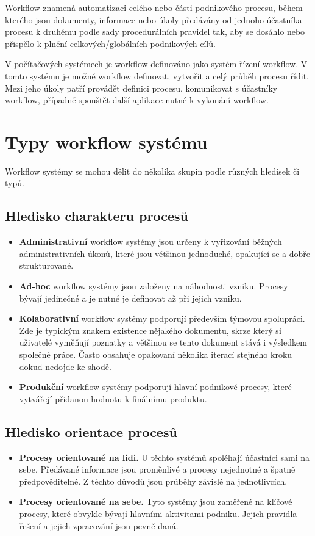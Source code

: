 \documentclass{fithesis}
\begin{document}
Workflow znamená automatizaci celého nebo části podnikového procesu, během kterého jsou dokumenty, informace nebo úkoly předávány od jednoho účastníka procesu k druhému podle sady procedurálních pravidel tak, aby se dosáhlo nebo přispělo k plnění celkových/globálních podnikových cílů. \cite{wfmc}

V počítačových systémech je workflow definováno jako systém řízení workflow. V tomto systému je možné workflow definovat, vytvořit a celý průběh procesu řídit. Mezi jeho úkoly patří provádět definici procesu, komunikovat s účastníky workflow, případně spouštět další aplikace nutné k vykonání workflow.


\section{Typy workflow systému}
Workflow systémy se mohou dělit do několika skupin podle různých hledisek či typů. \cite{workflow}

\subsection{Hledisko charakteru procesů}
\begin{itemize}
\item \textbf{Administrativní} workflow systémy jsou určeny k vyřizování běžných administrativních úkonů, které jsou většinou jednoduché, opakující se a dobře strukturované.
\item \textbf{Ad-hoc} workflow systémy jsou založeny na náhodnosti vzniku. Procesy bývají jedinečné a je nutné je definovat až při jejich vzniku.
\item \textbf{Kolaborativní} workflow systémy podporují především týmovou spolupráci. Zde je typickým znakem existence nějakého dokumentu, skrze který si uživatelé vyměňují poznatky a většinou se tento dokument stává i výsledkem společné práce. Často obsahuje opakovaní několika iterací stejného kroku dokud nedojde ke shodě.
\item \textbf{Produkční} workflow systémy podporují hlavní podnikové procesy, které vytvářejí přidanou hodnotu k finálnímu produktu.
\end{itemize}

\subsection{Hledisko orientace procesů}
\begin{itemize}
\item \textbf{Procesy orientované na lidi.} U těchto systémů spoléhají účastníci sami na sebe. Předávané informace jsou proměnlivé a procesy nejednotné a špatně předpověditelné. Z těchto důvodů jsou průběhy závislé na jednotlivcích.
\item \textbf{Procesy orientované na sebe.} Tyto systémy jsou zaměřené na klíčové procesy, které obvykle bývají hlavními aktivitami podniku. Jejich pravidla řešení a jejich zpracování jsou pevně daná.
\end{itemize}
\end{document}
